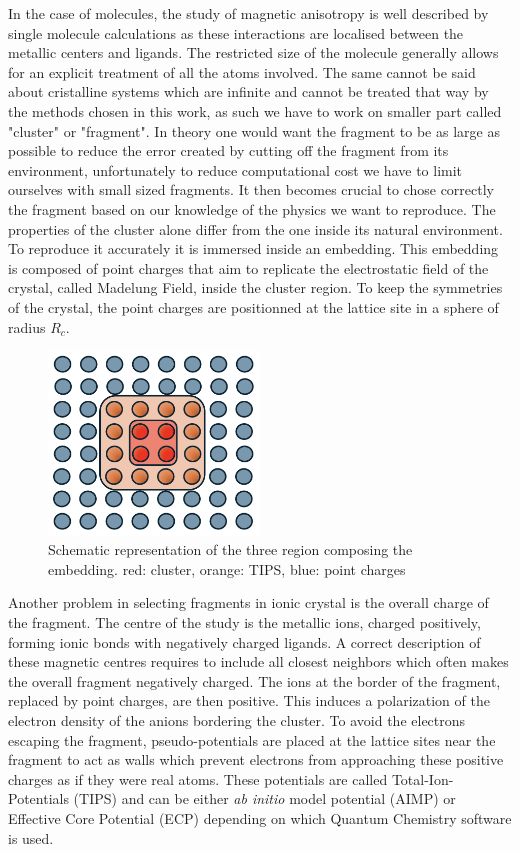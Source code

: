 \documentclass[12pt]{report}
\numberwithin{equation}{section}
\begin{document}
In the case of molecules, the study of magnetic anisotropy is well described by single molecule calculations as these interactions are localised between the metallic centers and ligands. 
The restricted size of the molecule generally allows for an explicit treatment of all the atoms involved.
The same cannot be said about cristalline systems which are infinite and cannot be treated that way by the methods chosen in this work, as such we have to work on smaller part called "cluster" or "fragment".
In theory one would want the fragment to be as large as possible to reduce the error created by cutting off the fragment from its environment, unfortunately to reduce computational cost we have to limit ourselves with small sized fragments. 
It then becomes crucial to chose correctly the fragment based on our knowledge of the physics we want to reproduce.
The properties of the cluster alone differ from the one inside its natural environment. To reproduce it accurately it is immersed inside an embedding. 
This embedding is composed of point charges that aim to replicate the electrostatic field of the crystal, called Madelung Field, inside the cluster region. 
To keep the symmetries of the crystal, the point charges are positionned at the lattice site in a sphere of radius $R_c$. 
\begin{figure}[!ht]
    \centering
    \includegraphics[width=0.5\textwidth]{Images/Bain.png}
    \caption{Schematic representation of the three region composing the embedding. red: cluster, orange: TIPS, blue: point charges}
    \label{Bain}
\end{figure}
Another problem in selecting fragments in ionic crystal is the overall charge of the fragment.
The centre of the study is the metallic ions, charged positively, forming ionic bonds with negatively charged ligands.
A correct description of these magnetic centres requires to include all closest neighbors which often makes the overall fragment negatively charged.
The ions at the border of the fragment, replaced by point charges, are then positive. This induces a polarization of the electron density of the anions bordering the cluster.
To avoid the electrons escaping the fragment, pseudo-potentials are placed at the lattice sites near the fragment to act as walls which prevent electrons from approaching these positive charges as if they were real atoms.
These potentials are called Total-Ion-Potentials (TIPS) and can be either \textit{ab initio} model potential (AIMP) or Effective Core Potential (ECP) depending on which Quantum Chemistry software is used.
\end{document}
